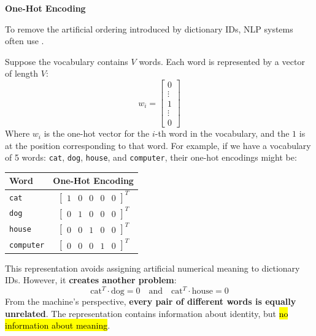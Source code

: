 \highspace
\begin{flushleft}
    \textcolor{Red2}{ \textbf{One-Hot Encoding}}\label{def:one-hot-encoding}
\end{flushleft}
To remove the artificial ordering introduced by dictionary IDs, NLP systems often use .

\highspace
Suppose the vocabulary contains $V$ words. Each word is represented by a vector of length $V$:
\begin{equation*}
    w_i = \begin{bmatrix}
        0 \\
        \vdots \\
        1 \\
        \vdots \\
        0
    \end{bmatrix}
\end{equation*}
Where $w_i$ is the one-hot vector for the $i$-th word in the vocabulary, and the $1$ is at the position corresponding to that word. For example, if we have a vocabulary of 5 words: \texttt{cat}, \texttt{dog}, \texttt{house}, and \texttt{computer}, their one-hot encodings might be:
\begin{center}
    \begin{tabular}{@{} l c @{}}
        \toprule
        \textbf{Word} & \textbf{One-Hot Encoding} \\
        \midrule
        \texttt{cat} & $\begin{bmatrix} 1 & 0 & 0 & 0 & 0 \end{bmatrix}^{T}$ \\
        \texttt{dog} & $\begin{bmatrix} 0 & 1 & 0 & 0 & 0 \end{bmatrix}^{T}$ \\
        \texttt{house} & $\begin{bmatrix} 0 & 0 & 1 & 0 & 0 \end{bmatrix}^{T}$ \\
        \texttt{computer} & $\begin{bmatrix} 0 & 0 & 0 & 1 & 0 \end{bmatrix}^{T}$ \\
        \bottomrule
    \end{tabular}
\end{center}

\noindent
This representation avoids assigning artificial numerical meaning to dictionary IDs. However, it \textbf{creates another problem}:
\begin{equation*}
    \text{cat}^{T} \cdot \text{dog} = 0 \quad \text{and} \quad \text{cat}^{T} \cdot \text{house} = 0
\end{equation*}
From the machine's perspective, \textbf{every pair of different words is equally unrelated}. The representation contains information about identity, but \hl{no information about meaning}.

